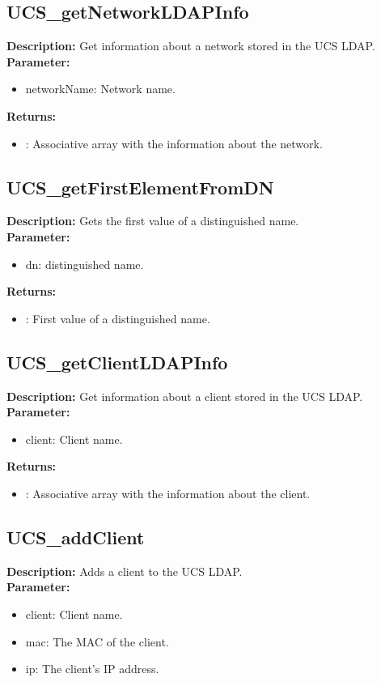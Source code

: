 \subsection{UCS\_getNetworkLDAPInfo}
\textbf{Description:} Get information about a network stored in the UCS LDAP.\\
\textbf{Parameter:}
\begin{itemize}
\item networkName: Network name.
\end{itemize}
\textbf{Returns:}
\begin{itemize}
\item : Associative array with the information about the network.
\end{itemize}

\subsection{UCS\_getFirstElementFromDN}
\textbf{Description:} Gets the first value of a distinguished name.\\
\textbf{Parameter:}
\begin{itemize}
\item dn: distinguished name.
\end{itemize}
\textbf{Returns:}
\begin{itemize}
\item : First value of a distinguished name.
\end{itemize}

\subsection{UCS\_getClientLDAPInfo}
\textbf{Description:} Get information about a client stored in the UCS LDAP.\\
\textbf{Parameter:}
\begin{itemize}
\item client: Client name.
\end{itemize}
\textbf{Returns:}
\begin{itemize}
\item : Associative array with the information about the client.
\end{itemize}

\subsection{UCS\_addClient}
\textbf{Description:} Adds a client to the UCS LDAP.\\
\textbf{Parameter:}
\begin{itemize}
\item client: Client name.
\item mac: The MAC of the client.
\item ip: The client's IP address.
\end{itemize}

